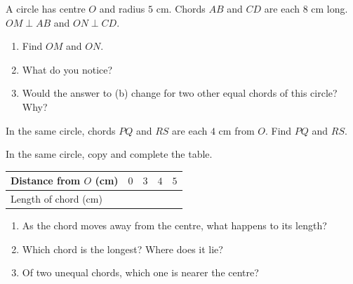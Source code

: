 \begin{solvefirst}
  \item A circle has centre $O$ and radius $5$ cm. Chords $AB$ and $CD$ are each $8$ cm long. $OM\perp AB$ and $ON\perp CD$.
  \begin{enumerate}[label=(\alph*),itemsep=1pt]
    \item Find $OM$ and $ON$.
    \item What do you notice?
    \item Would the answer to (b) change for two other equal chords of this circle? Why?
  \end{enumerate}
  \item In the same circle, chords $PQ$ and $RS$ are each $4$ cm from $O$. Find $PQ$ and $RS$.
  \item In the same circle, copy and complete the table.
  \begin{center}
  \begin{tabular}{|l|c|c|c|c|}\hline
  Distance from $O$ (cm) & $0$ & $3$ & $4$ & $5$\\ \hline
  Length of chord (cm) & & & & \\ \hline
  \end{tabular}
  \end{center}
  \begin{enumerate}[label=(\alph*),itemsep=1pt]
    \item As the chord moves away from the centre, what happens to its length?
    \item Which chord is the longest? Where does it lie?
    \item Of two unequal chords, which one is nearer the centre?
  \end{enumerate}
\end{solvefirst}

